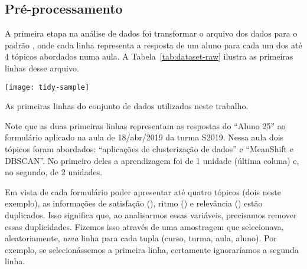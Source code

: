 \subsection{Pré-processamento}

A primeira etapa na análise de dados foi transformar o arquivo dos dados para o padrão  \cite{Wicham2014}, onde cada linha representa a resposta de um aluno para cada um dos até 4 tópicos abordados numa aula.
A Tabela~\ref{tab:dataset-raw} ilustra as primeiras linhas desse arquivo.

\begin{table}
	\centering
	\texttt{[image: tidy-sample]}
	\caption{As primeiras linhas do conjunto de dados utilizados neste trabalho.}
	\label{tab:dataset-raw}
\end{table}

Note que as duas primeiras linhas representam as respostas do ``Aluno 25'' ao formulário aplicado na aula de 18/abr/2019 da turma S2019. Nessa aula dois tópicos foram abordados: ``aplicações de clusterização de dados'' e ``MeanShift e DBSCAN''. No primeiro deles a aprendizagem foi de 1 unidade (última coluna) e, no segundo, de 2 unidades.

Em vista de cada formulário poder apresentar até quatro tópicos (dois neste exemplo), as informações de satisfação (), ritmo () e relevância () estão duplicados. Isso significa que, ao analisarmos essas variáveis, precisamos remover essas duplicidades.
Fizemos isso através de uma amostragem que selecionava, aleatoriamente, \emph{uma} linha para cada tupla (curso, turma, aula, aluno).
Por exemplo, se selecionássemos a primeira linha, certamente ignoraríamos a segunda linha.

